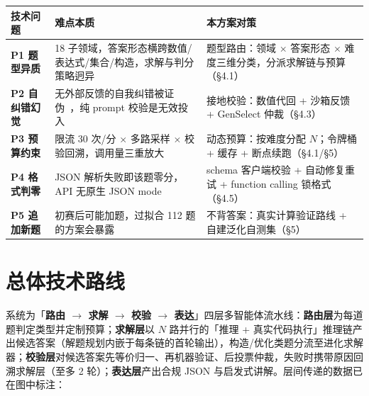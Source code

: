\documentclass[11pt, a4paper]{ctexart}
\newcommand{\hl}[1]{\textcolor{accentred}{\textbf{#1}}}
\begin{document}
\begin{center}
\small
\begin{tabular}{p{}p{}p{}}
\toprule
\textbf{技术问题} & \textbf{难点本质} & \textbf{本方案对策} \\
\midrule
\hl{P1 题型异质} & 18 子领域，答案形态横跨数值/表达式/集合/构造，求解与判分策略迥异 & 题型路由：领域 $\times$ 答案形态 $\times$ 难度三维分类，分派求解链与预算（\S4.1） \\
\addlinespace[0.3em]
\hl{P2 自纠错幻觉} & 无外部反馈的自我纠错被证伪~\cite{selfcorrect}，纯 prompt 校验是无效投入 & 接地校验：数值代回 + 沙箱反馈 + GenSelect 仲裁（\S4.3） \\
\addlinespace[0.3em]
\hl{P3 预算约束} & 限流 30 次/分 $\times$ 多路采样 $\times$ 校验回溯，调用量三重放大 & 动态预算：按难度分配 $N$；令牌桶 + 缓存 + 断点续跑（\S4.1/\S5） \\
\addlinespace[0.3em]
\hl{P4 格式判零} & JSON 解析失败即该题零分，API 无原生 JSON mode & schema 客户端校验 + 自动修复重试 + function calling 锁格式（\S4.5） \\
\addlinespace[0.3em]
\hl{P5 追加新题} & 初赛后可能加题，过拟合 112 题的方案会暴露 & 不背答案：真实计算验证路线 + 自建泛化自测集（\S5） \\
\bottomrule
\end{tabular}
\end{center}

\section{总体技术路线}

系统为「\hl{路由 $\rightarrow$ 求解 $\rightarrow$ 校验 $\rightarrow$ 表达}」四层多智能体流水线：\hl{路由层}为每道题判定类型并定制预算；\hl{求解层}以 $N$ 路并行的「推理 + 真实代码执行」推理链产出候选答案（解题规划内嵌于每条链的首轮输出），构造/优化类题分流至进化求解器；\hl{校验层}对候选答案先等价归一、再机器验证、后投票仲裁，失败时携带原因回溯求解层（至多 2 轮）；\hl{表达层}产出合规 JSON 与启发式讲解。层间传递的数据已在图中标注：
\end{document}
